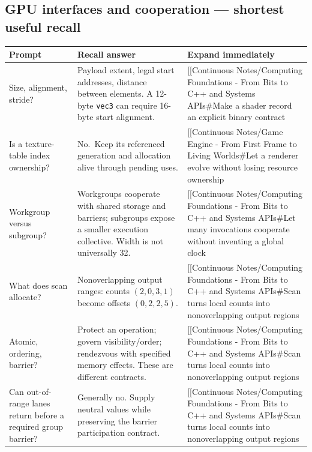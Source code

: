 \subsection{GPU interfaces and cooperation --- shortest useful recall}\label{appendix-960160274237-gpu-interfaces-and-cooperation-shortest-useful-recall}

{\def\LTcaptype{none} %
\begin{longtable}[]{@{}
  >{\raggedright\arraybackslash}p{}
  >{\raggedright\arraybackslash}p{}
  >{\raggedright\arraybackslash}p{}@{}}
\toprule\noalign{}
\begin{minipage}[b]{\linewidth}\raggedright
Prompt
\end{minipage} & \begin{minipage}[b]{\linewidth}\raggedright
Recall answer
\end{minipage} & \begin{minipage}[b]{\linewidth}\raggedright
Expand immediately
\end{minipage} \\
\midrule\noalign{}
\endhead
\bottomrule\noalign{}
\endlastfoot
Size, alignment, stride? & Payload extent, legal start addresses, distance between elements. A 12-byte \texttt{vec3} can require 16-byte start alignment. & {[}{[}Continuous Notes/Computing Foundations - From Bits to C++ and Systems APIs\#Make a shader record an explicit binary contract \\
Is a texture-table index ownership? & No.~Keep its referenced generation and allocation alive through pending uses. & {[}{[}Continuous Notes/Game Engine - From First Frame to Living Worlds\#Let a renderer evolve without losing resource ownership \\
Workgroup versus subgroup? & Workgroups cooperate with shared storage and barriers; subgroups expose a smaller execution collective. Width is not universally 32. & {[}{[}Continuous Notes/Computing Foundations - From Bits to C++ and Systems APIs\#Let many invocations cooperate without inventing a global clock \\
What does scan allocate? & Nonoverlapping output ranges: counts \((2,0,3,1)\) become offsets \((0,2,2,5)\). & {[}{[}Continuous Notes/Computing Foundations - From Bits to C++ and Systems APIs\#Scan turns local counts into nonoverlapping output regions \\
Atomic, ordering, barrier? & Protect an operation; govern visibility/order; rendezvous with specified memory effects. These are different contracts. & {[}{[}Continuous Notes/Computing Foundations - From Bits to C++ and Systems APIs\#Scan turns local counts into nonoverlapping output regions \\
Can out-of-range lanes return before a required group barrier? & Generally no. Supply neutral values while preserving the barrier participation contract. & {[}{[}Continuous Notes/Computing Foundations - From Bits to C++ and Systems APIs\#Scan turns local counts into nonoverlapping output regions \\
\end{longtable}
}

